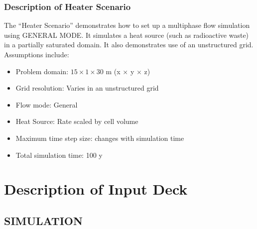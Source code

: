 \documentclass{beamer}
\newcommand\redcomment[1]{{{\color{red} #1}}}
\begin{document}
\begin{frame}\frametitle{Description of Heater Scenario}
The ``Heater Scenario'' demonstrates how to set up a multiphase flow simulation using \redcomment{GENERAL MODE}. It simulates a heat source (such as radioactive waste) in a partially saturated domain. It also demonstrates use of an \redcomment{unstructured grid}. Assumptions include:
\begin{itemize}
  \item Problem domain: $15 \times 1 \times 30$ m (x $\times$ y $\times$ z)
  \item Grid resolution: Varies in an unstructured grid
  \item Flow mode: General
  \item Heat Source: Rate scaled by cell volume
  \item Maximum time step size: changes with simulation time
  \item Total simulation time: 100 y
\end{itemize}

\end{frame}




\section{Description of Input Deck}

\subsection{SIMULATION}
\end{document}
